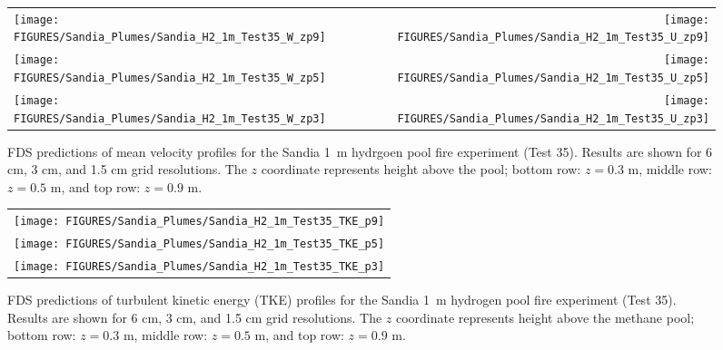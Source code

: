 \begin{figure}[p]
\begin{tabular*}{\textwidth}{l@{\extracolsep{\fill}}r}
\texttt{[image: FIGURES/Sandia\_Plumes/Sandia\_H2\_1m\_Test35\_W\_zp9]} &
\texttt{[image: FIGURES/Sandia\_Plumes/Sandia\_H2\_1m\_Test35\_U\_zp9]} \\
\texttt{[image: FIGURES/Sandia\_Plumes/Sandia\_H2\_1m\_Test35\_W\_zp5]} &
\texttt{[image: FIGURES/Sandia\_Plumes/Sandia\_H2\_1m\_Test35\_U\_zp5]} \\
\texttt{[image: FIGURES/Sandia\_Plumes/Sandia\_H2\_1m\_Test35\_W\_zp3]} &
\texttt{[image: FIGURES/Sandia\_Plumes/Sandia\_H2\_1m\_Test35\_U\_zp3]}
\end{tabular*}
\caption[Sandia 1~m hydrogen pool fire (Test 35) mean velocity profiles.]
{FDS predictions of mean velocity profiles for the Sandia 1~m hydrgoen pool fire experiment (Test 35). Results are shown for 6 cm, 3 cm, and 1.5 cm grid resolutions. The $z$ coordinate represents height above the pool; bottom row: $z=0.3$ m, middle row: $z=0.5$ m, and top row: $z=0.9$ m.}
\label{Sandia_H2_1m_Test35_velocity}
\end{figure}

\begin{figure}[p]
\begin{center}
\begin{tabular}{c}
\texttt{[image: FIGURES/Sandia\_Plumes/Sandia\_H2\_1m\_Test35\_TKE\_p9]} \\
\texttt{[image: FIGURES/Sandia\_Plumes/Sandia\_H2\_1m\_Test35\_TKE\_p5]} \\
\texttt{[image: FIGURES/Sandia\_Plumes/Sandia\_H2\_1m\_Test35\_TKE\_p3]} 
\end{tabular}
\caption[Sandia 1~m hydrogen pool fire (Test 25) turbulent kinetic energy.]
{FDS predictions of turbulent kinetic energy (TKE) profiles for the Sandia 1~m hydrogen pool fire experiment (Test 35). Results are shown for 6 cm, 3 cm, and 1.5 cm grid resolutions. The $z$ coordinate represents height above the methane pool; bottom row: $z=0.3$ m, middle row: $z=0.5$ m, and top row: $z=0.9$ m.}
\label{Sandia_H2_1m_Test35_tke}
\end{center}
\end{figure}

\clearpage

